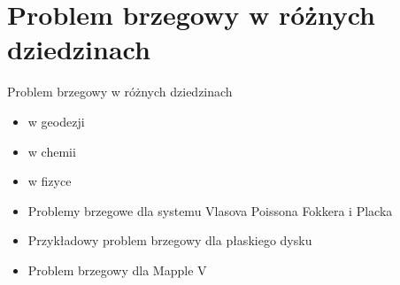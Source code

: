 \section{Problem brzegowy w różnych dziedzinach}
\begin{frame}{Problem brzegowy w różnych dziedzinach}
	\begin{itemize}
		\item w geodezji
        \item w chemii
        \item w fizyce
        \item Problemy brzegowe dla systemu Vlasova Poissona Fokkera i Placka
        \item Przykładowy problem brzegowy dla płaskiego dysku
        \item Problem brzegowy dla Mapple V
    \end{itemize}
\end{frame}